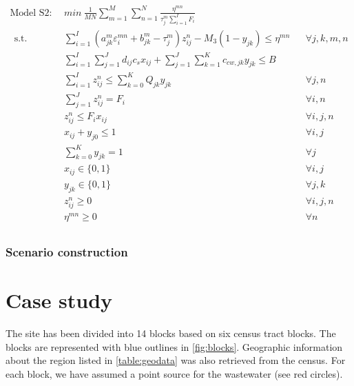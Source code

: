 \documentclass[preprint,12pt,authoryear]{elsarticle}
\begin{document}
\pagebreak
\setcounter{equation}{0}
\begin{align}\label{model:S2}
	\text{Model S2}:~~&min ~ \frac{1}{MN}\sum_{m=1}^M\sum_{n=1}^N \frac{\eta^{mn}}{\tau_j^m \sum_{i=1}^I F_i} \nonumber\\~~
	\mbox{s.t.}~~
	&\sum_{i=1}^I (a_{jk}^m \varepsilon_i^{mn} + b_{jk}^m - \tau_j^m) z_{ij}^n - M_3 (1 - y_{jk})\leq \eta^{mn} && \forall j,k,m,n\\	
	&\sum_{i=1}^{I}\sum_{j=1}^{J}d_{ij}c_s x_{ij} + \sum_{j=1}^{J}\sum_{k=1}^{K}c_{cw,jk}y_{jk} \leq B && \\
 	&\sum_{i=1}^{I} z_{ij}^n \leq \sum_{k=0}^K Q_{jk} y_{jk} && \forall j,n\\
	&\sum_{j=1}^J z_{ij}^n = F_i && \forall i,n\\
	&z_{ij}^n \leq F_i x_{ij} && \forall i,j,n\\
	&x_{ij} + y_{j0} \leq 1 && \forall i,j\\
	&\sum_{k=0}^{K}y_{jk} = 1&&\forall j\\
	&x_{ij} \in \{0,1\}&&\forall i,j\\
	&y_{jk} \in \{0,1\}&&\forall j,k\\
	&z_{ij}^n \geq 0&&\forall i,j,n\\ 
	&\eta^{mn} \geq 0&&\forall n\\
\end{align}
\renewcommand{\theequation}{\thesection--\arabic{equation}}
\newpage

\subsubsection{Scenario construction}\label{scengen}

\section{Case study}
The site has been divided into 14 blocks based on six census tract blocks. The blocks are represented with blue outlines in \autoref{fig:blocks}. Geographic information about the region listed in \autoref{table:geodata} was also retrieved from the census. \citep{acs2015} For each block, we have assumed a point source for the wastewater (see red circles).
\end{document}
